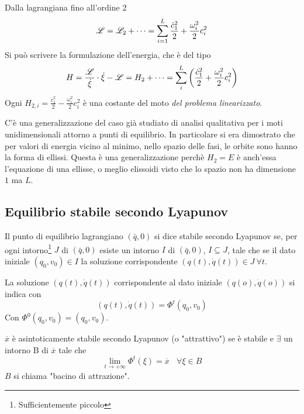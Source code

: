 \documentclass[Main.tex]{subfiles}
\begin{document}
\begin{osservazioni}
	\item Dalla lagrangiana fino all'ordine 2
	\begin{equation}
		\mathscr{L} =\mathscr{L}_2 + \dots  = \sum_{i=1}^L \frac{\dot c_1^2}{2} + \frac{\omega_i^2}{2} c_i^2
	\end{equation}
	Si può scrivere la formulazione dell'energia, che è del tipo 
	\begin{equation}
		H = \frac{\mathscr{L}}{\dot \xi} \cdot \dot \xi - \mathscr{L} = H_2 + \dots = \sum_i^L \left( \frac{\dot c_1^2}{2} + \frac{\omega_i^2}{2} c_i^2 \right)
	\end{equation}
	Ogni $H_{2,i} = \frac{\dot c_1^2}{2} - \frac{\omega_i^2}{2} c_i^2$ è una costante del moto \emph{del problema linearizzato}.
	
	\item C'è una generalizzazione del caso già studiato di analisi qualitativa per i moti unidimensionali attorno a punti di equilibrio. In particolare si era dimostrato che per valori di energia vicino al minimo, nello spazio delle fasi, le orbite sono hanno la forma di ellissi. Questa è una generalizzazione perchè $H_2=E$ è anch'essa l'equazione di una ellisse, o meglio elissoidi visto che lo spazio non ha dimensione $1$ ma $L$.
\end{osservazioni}



\newpage
\subsection{Equilibrio stabile secondo Lyapunov}
\begin{df}
	Il punto di equilibrio lagrangiano $(\bar q ,0 )$ si dice stabile secondo Lyapunov se, per ogni intorno\footnote{Sufficientemente piccolo} $J$ di $(\bar q ,0)$ esiste un intorno $I$ di $(\bar q, 0 ) $, $I \subseteq J$, tale che se il dato iniziale $(q_0, v_0) \in I$ la soluzione corrispondente $(q(t), \dot q(t)) \in J \ \forall t$.	
\end{df}
\noindent 
La soluzione $(q(t), \dot q(t))$ corrispondente al dato iniziale $(q(o), \dot q(o))$ si indica con 
\begin{equation}
	(q(t), \dot q(t)) = \Phi^t (q_0 , v_0)
\end{equation}
Con $\Phi^0(q_0,v_0) = (q_0, v_0)$. 

\begin{df}
	 $\overline x$ è asintoticamente  stabile secondo Lyapunov (o "attrattivo") se è stabile e $\exists$ un intorno B di $\overline x$ tale che $$
 \lim_{t \rightarrow + \infty} \Phi^t (\xi) = \overline x \ \ \ \ \forall \xi \in B$$
 $B$ si chiama "bacino di attrazione".
\end{df}
\end{document}
